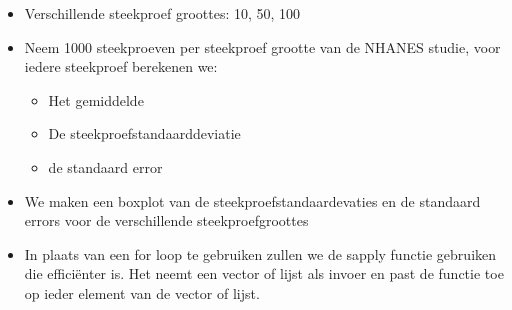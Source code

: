 \documentclass[
  12pt,dutch,coursenotes]{book}
\providecommand{\tightlist}{%
  \setlength{\itemsep}{0pt}\setlength{\parskip}{0pt}}
\theoremstyle{definition}
\theoremstyle{definition}
\theoremstyle{definition}
\theoremstyle{remark}
\begin{document}
\begin{itemize}
\item
  Verschillende steekproef groottes: 10, 50, 100
\item
  Neem 1000 steekproeven per steekproef grootte van de NHANES studie, voor iedere steekproef berekenen we:

  \begin{itemize}
  \tightlist
  \item
    Het gemiddelde
  \item
    De steekproefstandaarddeviatie
  \item
    de standaard error
  \end{itemize}
\item
  We maken een boxplot van de steekproefstandaardevaties en de standaard errors voor de verschillende steekproefgroottes
\item
  In plaats van een for loop te gebruiken zullen we de sapply functie gebruiken die efficiënter is. Het neemt een vector of lijst als invoer en past de functie toe op ieder element van de vector of lijst.
\end{itemize}
\end{document}
